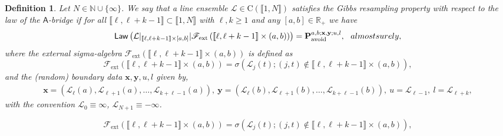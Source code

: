 \documentclass[10pt,a4paper]{amsart}
\newtheorem{defn}{Definition}
\begin{document}
\begin{defn}\label{GibbsDefinition}
Let $N \in \mathbb{N}\cup \{\infty\}$. We say that a line ensemble $\mathcal{L}\in \mathrm{C}(\llbracket 1, N \rrbracket)$ satisfies the Gibbs resampling property with respect to the law of the $\mathsf{A}$-bridge if for all $\llbracket \ell,\ell+k-1 \rrbracket \subset \llbracket 1, N \rrbracket$ with $\ell, k \ge 1$ and any $[a,b]\in \mathbb{R}_+$ we have
\begin{equation}\label{GibbsPropertyFormal}
\mathsf{Law}\left(\mathcal{L}|_{\llbracket \ell,\ell+k-1 \rrbracket \times [a,b]}|\mathscr{F}_{\mathrm{ext}}\left(\llbracket \ell, \ell+k-1 \rrbracket \times (a,b) \right)\right)=\mathbf{P}_{\mathrm{avoid}}^{a,b;\mathbf{x},\mathbf{y};u,l},\ \ \textnormal{ almost surely,}
\end{equation}
where the external sigma-algebra $\mathscr{F}_{\mathrm{ext}}\left(\llbracket \ell, \ell+k-1 \rrbracket \times (a,b) \right)$ is defined as
\begin{equation}\label{ExternalSigmaAlgebra}
\mathscr{F}_{\mathrm{ext}}\left(\llbracket \ell, \ell+k-1 \rrbracket \times (a,b) \right)= \sigma\left(\mathcal{L}_j(t);(j,t)\notin \llbracket \ell, \ell+k-1 \rrbracket\times (a,b)\right), 
\end{equation}
and the (random) boundary data $\mathbf{x},\mathbf{y},u,l$ given by,
\begin{align*}
\mathbf{x}=\left(\mathcal{L}_\ell(a),\mathcal{L}_{\ell+1}(a),\dots,\mathcal{L}_{k+\ell-1}(a)\right), \  \mathbf{y}=\left(\mathcal{L}_{\ell}(b),\mathcal{L}_{\ell+1}(b),\dots,\mathcal{L}_{k+\ell-1}(b)\right), \ u=\mathcal{L}_{\ell-1},  \ l=\mathcal{L}_{\ell+k},
\end{align*}
with the convention $\mathcal{L}_{0}\equiv \infty$, $\mathcal{L}_{N+1}\equiv -\infty$.
\end{defn}

\begin{equation}
\mathscr{F}_{\mathrm{ext}}\left(\llbracket \ell, \ell+k-1 \rrbracket \times (a,b) \right)= \sigma\left(\mathcal{L}_j(t);(j,t)\notin \llbracket \ell, \ell+k-1 \rrbracket\times (a,b)\right), 
\end{equation}
\end{document}
